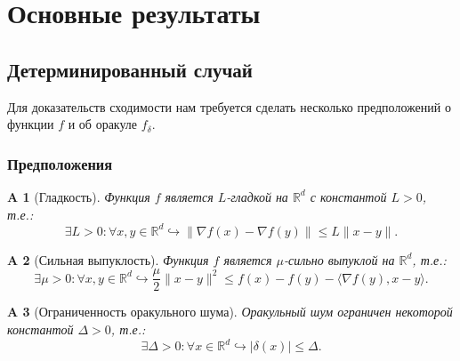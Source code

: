 \documentclass{article}
\newtheorem{assumption}{A}
\begin{document}
\section{Основные результаты}
\subsection{Детерминированный случай}
Для доказательств сходимости нам требуется сделать несколько предположений о функции $f$ и об оракуле $f_\delta$.
\subsubsection{Предположения}
\begin{assumption}[Гладкость]\label{A1}
 Функция $f$ является $L$-гладкой на $\mathbb{R}^d$ с константой $L > 0$, т.е.:
 \begin{equation}
  \exists L > 0: \forall x, y \in \mathbb{R}^d \hookrightarrow \|\nabla f(x) - \nabla f(y)\| \leqslant L \|x - y\|.
  \label{l_smoothness}
 \end{equation}
\end{assumption}

\begin{assumption}[Сильная выпуклость]\label{A2}
 Функция $f$ является $ \mu$-сильно выпуклой на $\mathbb{R}^d$, т.е.:
 \begin{equation}
  \exists \mu > 0: \forall x, y \in \mathbb{R}^d \hookrightarrow \frac{\mu}{2}\|x - y\|^2 \leqslant f(x) - f(y) - \langle \nabla f(y), x - y \rangle.
  \label{mu_strongly_convexity}
 \end{equation}
\end{assumption}


\begin{assumption}[Ограниченность оракульного шума]\label{A3}
 Оракульный шум ограничен некоторой константой $\Delta > 0$, т.е.:
 \begin{equation}
  \exists \Delta > 0: \forall x \in \mathbb{R}^d \hookrightarrow |\delta(x)| \leqslant \Delta.
  \label{bounded_oracle_noise}
 \end{equation}
\end{assumption}
\end{document}
